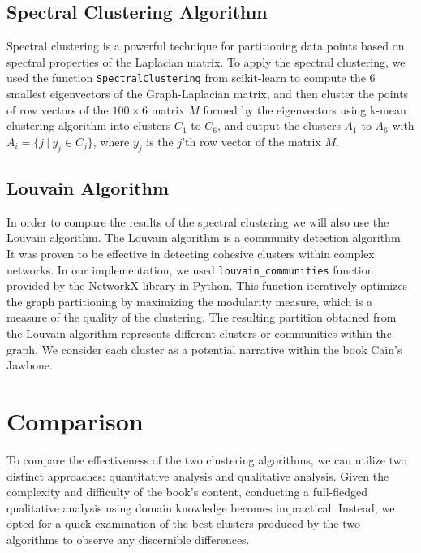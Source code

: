 \documentclass[a4paper]{article}
\begin{document}
\subsection{Spectral Clustering Algorithm}

Spectral clustering is a powerful technique for partitioning data points based on spectral properties of the Laplacian matrix. To apply the spectral clustering, we used the function \verb|SpectralClustering| from scikit-learn \cite{sklearn} to compute the 6 smallest eigenvectors of the Graph-Laplacian matrix, and then cluster the points of row vectors of the $100 \times 6$ matrix $M$ formed by the eigenvectors using k-mean clustering algorithm into clusters $C_1$ to $C_6$, and output the clusters $A_1$ to $A_6$ with $A_{i} = \{j \ | \ y_{j} \in C_{j}\}$, where $y_{j}$ is the $j$'th row vector of the matrix $M$.

\subsection{Louvain Algorithm}

In order to compare the results of the spectral clustering we will also use the Louvain algorithm. The Louvain algorithm is a community detection algorithm. It was proven to be effective in detecting cohesive clusters within complex networks. In our implementation, we used \verb|louvain_communities| function provided by the NetworkX \cite{networkx} library in Python. This function iteratively optimizes the graph partitioning by maximizing the modularity measure, which is a measure of the quality of the clustering. The resulting partition obtained from the Louvain algorithm represents different clusters or communities within the graph. We consider each cluster as a potential narrative within the book Cain's Jawbone.


\section{Comparison}

To compare the effectiveness of the two clustering algorithms, we can utilize two distinct approaches: quantitative analysis and qualitative analysis. Given the complexity and difficulty of the book's content, conducting a full-fledged qualitative analysis using domain knowledge becomes impractical. Instead, we opted for a quick examination of the best clusters produced by the two algorithms to observe any discernible differences.
\end{document}

